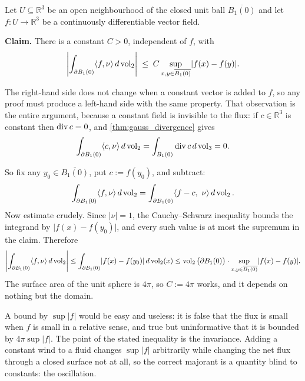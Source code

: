 \begin{example}
\label{ex:flux_bounded_by_oscillation}
Let $U \subseteq \mathbb{R}^3$ be an open neighbourhood of the closed unit ball
$\overline{B_1(0)}$ and let $f : U \to \mathbb{R}^3$ be a continuously differentiable vector field.

\textbf{Claim.} There is a constant $C > 0$, independent of $f$, with
\[\left\lvert \int_{\partial B_1(0)} \langle f,\nu\rangle \,d\operatorname{vol}_2 \right\rvert
  \;\le\; C \sup_{x,y \in \overline{B_1(0)}} \lvert f(x)-f(y)\rvert .\]

The right-hand side does not change when a constant vector is added to $f$, so any proof must
produce a left-hand side with the same property. That observation is the entire argument, because
a constant field is invisible to the flux: if $c \in \mathbb{R}^3$ is constant then
$\operatorname{div} c = 0$, and \cref{thm:gauss_divergence} gives
\[\int_{\partial B_1(0)} \langle c,\nu\rangle\,d\operatorname{vol}_2 = \int_{B_1(0)} \operatorname{div} c \, d\operatorname{vol}_3 = 0.\]

So fix any $y_0 \in \overline{B_1(0)}$, put $c := f(y_0)$, and subtract:
\[\int_{\partial B_1(0)} \langle f,\nu\rangle \,d\operatorname{vol}_2
 = \int_{\partial B_1(0)} \langle f - c,\ \nu\rangle \,d\operatorname{vol}_2 .\]
Now estimate crudely. Since $\lvert\nu\rvert = 1$, the Cauchy--Schwarz inequality bounds the
integrand by $\lvert f(x) - f(y_0)\rvert$, and every such value is at most the supremum in the
claim. Therefore
\[\left\lvert \int_{\partial B_1(0)} \langle f,\nu\rangle \,d\operatorname{vol}_2 \right\rvert
 \le \int_{\partial B_1(0)} \lvert f(x)-f(y_0)\rvert \,d\operatorname{vol}_2(x)
 \le \operatorname{vol}_2\big(\partial B_1(0)\big) \cdot \sup_{x,y\in\overline{B_1(0)}}\lvert f(x)-f(y)\rvert .\]
The surface area of the unit sphere is $4\pi$, so $C := 4\pi$ works, and it depends on nothing but
the domain.

\begin{remark}
A bound by $\sup\lvert f\rvert$ would be easy and useless: it is false that the flux is small when
$f$ is small in a relative sense, and true but uninformative that it is bounded by $4\pi\sup\lvert
f\rvert$. The point of the stated inequality is the invariance. Adding a constant wind to a fluid
changes $\sup\lvert f\rvert$ arbitrarily while changing the net flux through a closed surface not
at all, so the correct majorant is a quantity blind to constants: the oscillation.


\end{remark}
\end{example}
